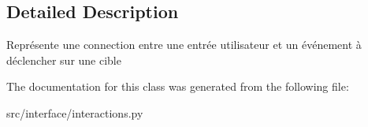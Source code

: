 \subsection{\-Detailed \-Description}
\begin{DoxyVerb}Représente une connection entre une entrée utilisateur 
    et un événement à déclencher sur une cible \end{DoxyVerb}
 

\-The documentation for this class was generated from the following file\-:\begin{DoxyCompactItemize}
\item 
src/interface/interactions.\-py\end{DoxyCompactItemize}
